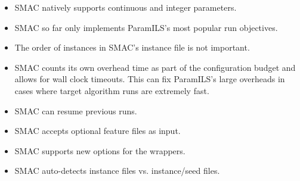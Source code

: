 \documentclass[11pt,letterpaper,twoside]{article}
\begin{document}
\begin{itemize}
\item SMAC natively supports continuous and integer parameters.
\item SMAC so far only implements ParamILS's most popular run objectives.
\item The order of instances in SMAC's instance file is not important.
\item SMAC counts its own overhead time as part of the configuration budget and allows for wall clock timeouts. This can fix ParamILS's large overheads in cases where target algorithm runs are extremely fast.
\item SMAC can resume previous runs.
\item SMAC accepts optional feature files as input.
\item SMAC supports new options for the wrappers.
\item SMAC auto-detects instance files vs. instance/seed files.
\end{itemize}
 
%

%
%

\footnotesize{
%

}
\end{document}
